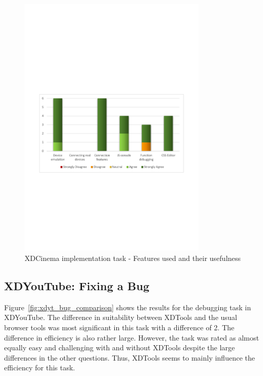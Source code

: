 \begin{figure}[h!]
  \centering
    \includegraphics[width=0.8\textwidth]{images/charts/xdc_impl_features_used.pdf}
	\caption[xdc-impl: Features used]{XDCinema implementation task - Features used and their usefulness}
	\label{fig:xdc_impl_features_used}
\end{figure}

\subsection{XDYouTube: Fixing a Bug}

Figure~\ref{fig:xdyt_bug_comparison} shows the results for the debugging task in XDYouTube. The difference in suitability between XDTools and the usual browser tools was most significant in this task with a difference of 2. The difference in efficiency is also rather large. However, the task was rated as almost equally easy and challenging with and without XDTools despite the large differences in the other questions. Thus, XDTools seems to mainly influence the efficiency for this task. 

